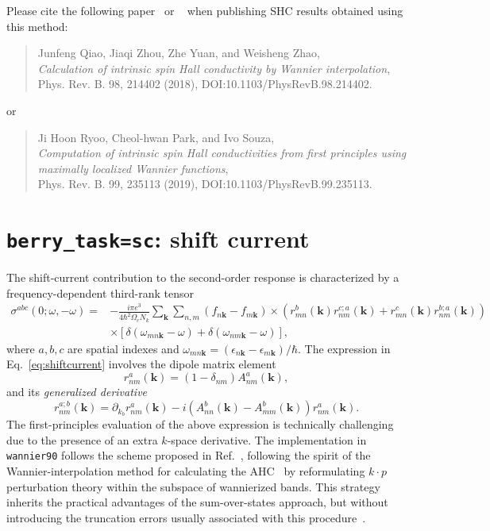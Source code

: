 Please cite the following paper~\cite{qiao-prb2018} or ~\cite{ryoo-prb2019} when publishing SHC results obtained using this method:
\begin{quote}
	Junfeng Qiao, Jiaqi Zhou, Zhe Yuan, and Weisheng Zhao, \\
	\emph{Calculation of intrinsic spin Hall conductivity by Wannier interpolation},\\
	Phys. Rev. B. 98, 214402 (2018), DOI:10.1103/PhysRevB.98.214402.
\end{quote}
or
\begin{quote}
	Ji Hoon Ryoo, Cheol-hwan Park, and Ivo Souza, \\
	\emph{Computation of intrinsic spin Hall conductivities from first principles using maximally localized Wannier functions},\\
	Phys. Rev. B. 99, 235113 (2019), DOI:10.1103/PhysRevB.99.235113.
\end{quote}


\section{{\tt berry\_task=sc}: shift current}


The shift-current contribution to the second-order response
is characterized by a frequency-dependent third-rank tensor~\cite{sipe-prb00}
\begin{equation}\label{eq:shiftcurrent}
\begin{split}
\sigma^{abc}(0;\omega,-\omega)=&-\frac{i\pi e^3}{4\hbar^2 \Omega_c N_k}
\sum_{\bm{k}} \sum_{n,m}(f_{n\bm{k}}-f_{m\bm{k}})
\times
\left(r^b_{ mn}(\bm{k})r^{c;a}_{nm}(\bm{k}) + r^c_{mn}(\bm{k})r^{b;a}_{ nm}(\bm{k})\right)\\
&\times \left[\delta(\omega_{mn\bm{k}}-\omega)+\delta(\omega_{nm\bm{k}}-\omega)\right],
\end{split}
\end{equation}
where $a,b,c$ are spatial indexes
and $\omega_{mn\bm{k}}=(\epsilon_{n\bm{k}}-\epsilon_{m\bm{k}})/\hbar$.
The expression in Eq.~\ref{eq:shiftcurrent} involves 
the dipole matrix element 
\begin{equation}
\label{eq:r}
r^a_{ nm}(\bm{k})=(1-\delta_{nm})A^a_{ nm}(\bm{k}),
\end{equation}
and its \emph{generalized
derivative}
%
\begin{equation}
\label{eq:gen-der}
r^{a;b}_{nm}(\bm{k})=\partial_{k_{b}} r^a_{nm}(\bm{k})
-i\left(A^b_{nn}(\bm{k})-A^b_{ mm}(\bm{k})\right)r^a_{ nm}(\bm{k}).
\end{equation}
The first-principles evaluation of the
above expression is technically challenging
due to the presence of an extra $k$-space derivative.
The implementation in {\tt wannier90} follows the scheme proposed in Ref.~\cite{ibanez-azpiroz_ab_2018}, 
following the spirit of the Wannier-interpolation 
method for calculating the AHC~\cite{wang-prb06} by reformulating $k\cdot p$
perturbation theory within the subspace of wannierized bands.
This strategy inherits the practical advantages of the sum-over-states
approach, but without introducing the truncation errors usually associated with this procedure~\cite{sipe-prb00}.

